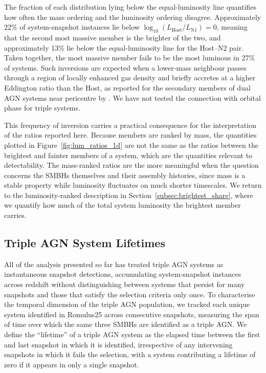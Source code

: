 \documentclass[twocolumn, 10pt]{article}
\begin{document}
The fraction of each distribution lying below the equal-luminosity line quantifies how often the mass ordering and the luminosity ordering disagree. Approximately 22\% of system-snapshot instances lie below $\log_{10}(L_\mathrm{Host}/L_\mathrm{N1}) = 0$, meaning that the second most massive member is the brighter of the two, and approximately 13\% lie below the equal-luminosity line for the Host--N2 pair. Taken together, the most massive member fails to be the most luminous in 27\% of systems. Such inversions are expected when a lower-mass neighbour passes through a region of locally enhanced gas density and briefly accretes at a higher Eddington ratio than the Host, as reported for the secondary members of dual AGN systems near pericentre by \citet{Saeedzadeh2024}. We have not tested the connection with orbital phase for triple systems.

This frequency of inversion carries a practical consequence for the interpretation of the ratios reported here. Because members are ranked by mass, the quantities plotted in Figure~\ref{fig:lum_ratios_1d} are not the same as the ratios between the brightest and fainter members of a system, which are the quantities relevant to detectability. The mass-ranked ratios are the more meaningful when the question concerns the SMBHs themselves and their assembly histories, since mass is a stable property while luminosity fluctuates on much shorter timescales. We return to the luminosity-ranked description in Section~\ref{subsec:brightest_share}, where we quantify how much of the total system luminosity the brightest member carries.

\subsection{Triple AGN System Lifetimes}
\label{subsec:lifetimes}
 
All of the analysis presented so far has treated triple AGN systems as instantaneous snapshot detections, accumulating system-snapshot instances across redshift without distinguishing between systems that persist for many snapshots and those that satisfy the selection criteria only once. To characterise the temporal dimension of the triple AGN population, we tracked each unique system identified in Romulus25 across consecutive snapshots, measuring the span of time over which the same three SMBHs are identified as a triple AGN. We define the ``lifetime'' of a triple AGN system as the elapsed time between the first and last snapshot in which it is identified, irrespective of any intervening snapshots in which it fails the selection, with a system contributing a lifetime of zero if it appears in only a single snapshot.
 
\end{document}
